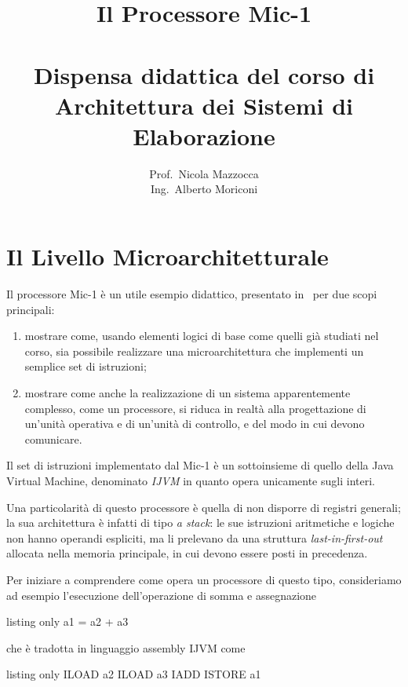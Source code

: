 \documentclass[a4paper,12pt]{scrreprt}
\title{Il Processore Mic-1 \\
  \ \\
  \large Dispensa didattica del corso di\\
  Architettura dei Sistemi di Elaborazione}
\author{Prof.\ Nicola Mazzocca \\
  Ing.\ Alberto Moriconi}
\date{}
\begin{document}
\maketitle

\chapter{Il Livello Microarchitetturale}

Il processore Mic-1 è un utile esempio didattico, presentato in~\cite{tanenbaum}
per due scopi principali:
\begin{enumerate}
  \item mostrare come, usando elementi logici di base come quelli già studiati
  nel corso, sia possibile realizzare una microarchitettura che implementi un
  semplice set di istruzioni;
  \item mostrare come anche la realizzazione di un sistema apparentemente
  complesso, come un processore, si riduca in realtà alla progettazione di
  un'unità operativa e di un'unità di controllo, e del modo in cui devono
  comunicare.
\end{enumerate}

Il set di istruzioni implementato dal Mic-1 è un sottoinsieme di quello della
Java Virtual Machine, denominato \textit{IJVM} in quanto opera unicamente sugli
interi.

Una particolarità di questo processore è quella di non disporre di registri
generali; la sua architettura è infatti di tipo \textit{a stack}: le sue
istruzioni aritmetiche e logiche non hanno operandi espliciti, ma li prelevano
da una struttura \textit{last-in-first-out} allocata nella memoria principale,
in cui devono essere posti in precedenza.

\medskip

Per iniziare a comprendere come opera un processore di questo tipo, consideriamo
ad esempio l'esecuzione dell'operazione di somma e assegnazione

\begin{tcblisting}{listing only}
  a1 = a2 + a3
\end{tcblisting}

che è tradotta in linguaggio assembly IJVM come

\begin{tcblisting}{listing only}
  ILOAD a2
  ILOAD a3
  IADD
  ISTORE a1
\end{tcblisting}
\end{document}
